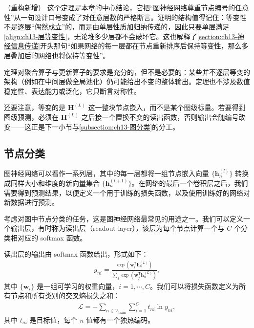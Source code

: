 \documentclass[../../main.tex]{subfiles}
\begin{document}
\begin{remark}（重构新增）
这个定理是本章的中心结论，它把“图神经网络尊重节点编号的任意性”从一句设计口号变成了对任意层数的严格断言。证明的结构值得记住：等变性不是逐层“偶然成立”的，而是由单层性质加归纳传递的，因此只要单层满足\eqref{align:ch13-层等变性}，无论堆多少层都不会破坏它。这也解释了\cref{section:ch13-神经信息传递}开头那句“如果网络的每一层都在节点重新排序后保持等变性，那么多层叠加后的网络也将保持等变性”。\par
定理对聚合算子与更新算子的要求是充分的，但不是必要的：某些并不逐层等变的架构（例如在中间层做全局池化）仍可能给出不变的整体输出。定理也不涉及数值稳定性、表达能力或泛化，它只断言对称性。\par
还要注意，等变的是 $\bm{H}^{(L)}$ 这一整块节点嵌入，而不是某个图级标量。若要得到图级预测，必须在 $\bm{H}^{(L)}$ 之后接一个置换不变的读出函数，否则输出会随编号改变——这正是下一小节与\cref{subsection:ch13-图分类}的分工。
\end{remark}

\subsection{节点分类}\label{subsection:ch13-节点分类}

图神经网络可以看作一系列层，其中的每一层都将一组节点嵌入向量 $\{\bm{h}_n^{(l)}\}$ 转换成同样大小和维度的新向量集合 $\{\bm{h}_n^{(l+1)}\}$。在网络的最后一个卷积层之后，我们需要得到预测结果，以便定义一个用于训练的损失函数，以及使用训练好的网络对新数据进行预测。

考虑对图中节点分类的任务，这是图神经网络最常见的用途之一。我们可以定义一个输出层，有时称为读出层（readout layer），该层为每个节点计算一个与 $C$ 个分类相对应的 softmax 函数。

\begin{definition}[读出层与节点分类损失]\label{definition:ch13-读出层}
读出层的输出由 softmax 函数给出，形式如下：
\begin{align}
y_{ni}=\frac{\exp\!\left(\bm{w}_i^{\mathsf T}\bm{h}_n^{(L)}\right)}{\sum_j\exp\!\left(\bm{w}_j^{\mathsf T}\bm{h}_n^{(L)}\right)},
\label{align:ch13-节点softmax}
\end{align}
其中 $\{\bm{w}_i\}$ 是一组可学习的权重向量，$i=1,\cdots,C$。我们可以将损失函数定义为所有节点和所有类别的交叉熵损失之和：
\begin{align}
\mathcal{L}=-\sum_{n\in\mathcal{V}_{\mathrm{train}}}\sum_{i=1}^{C}t_{ni}\ln y_{ni},
\label{align:ch13-节点交叉熵}
\end{align}
其中 $t_{ni}$ 是目标值，每个 $n$ 值都有一个独热编码。
\end{definition}
\end{document}
